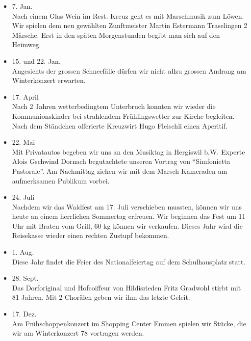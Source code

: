\begin{history}


    \begin{itemize}

        \item[]7. Jan.\\
        Nach einem Glas Wein im Rest. Kreuz geht es mit Marschmusik zum Löwen.
        Wir spielen dem neu gewählten Zunftmeister Martin Estermann Traselingen
        2 Märsche. Erst in den späten Morgenstunden begibt man sich auf den
        Heimweg.

        \item[]15. und 22. Jan.\\
        Angesichts der grossen Schneefälle dürfen wir nicht allzu grossen
        Andrang am Winterkonzert erwarten.

        \item[]17. April\\
        Nach 2 Jahren wetterbedingtem Unterbruch konnten wir wieder die
        Kommunionskinder bei strahlendem Frühlingswetter zur Kirche begleiten.
        Nach dem Ständchen offerierte Kreuzwirt Hugo Fleischli einen Aperitif.

        \item[]22. Mai\\
        Mit Privatautos begeben wir uns an den Musiktag in Hergiswil b.W.
        Experte Alois Gschwind Dornach begutachtete unseren Vortrag von
        \enquote{Simfonietta Pastorale}. Am Nachmittag ziehen wir mit dem Marsch
        Kameraden am aufmerksamen Publikum vorbei.

        \item[]24. Juli\\
        Nachdem wir das Waldfest am 17. Juli verschieben mussten, können wir uns
        heute an einem herrlichen Sommertag erfreuen. Wir beginnen das Fest um
        11 Uhr mit Braten vom Grill, 60 kg können wir verkaufen. Dieses Jahr
        wird die Reisekasse wieder einen rechten Zustupf bekommen.

        \item[]1. Aug.\\
        Diese Jahr findet die Feier des Nationalfeiertag auf dem Schulhausplatz
        statt.

        \item[]28. Sept.\\
        Das Dorforiginal und Hofcoiffeur von Hildisrieden Fritz Gradwohl stirbt
        mit 81 Jahren. Mit 2 Chorälen geben wir ihm das letzte Geleit.

        \item[]17. Dez.\\
        Am Frühschoppenkonzert im Shopping Center Emmen spielen wir Stücke, die
        wir am Winterkonzert 78 vortragen werden.

    \end{itemize}

\end{history}
